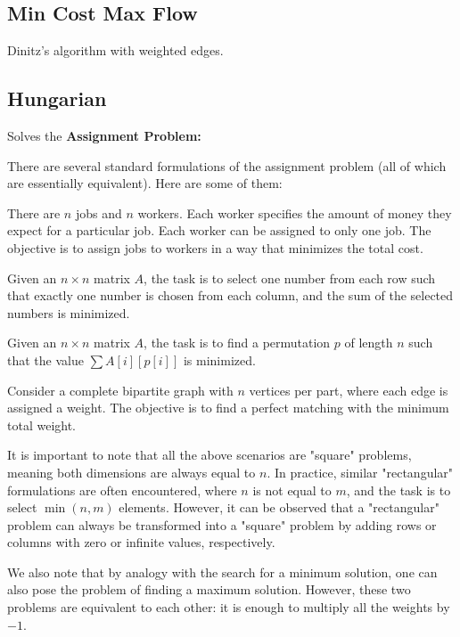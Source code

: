 	\subsection{Min Cost Max Flow}

		Dinitz's algorithm with weighted edges.


	\subsection{Hungarian}

		Solves the \textbf{Assignment Problem:}

		There are several standard formulations of the assignment problem (all of which are essentially equivalent). Here are some of them:

		There are $n$ jobs and $n$ workers. Each worker specifies the amount of money they expect for a particular job.
		Each worker can be assigned to only one job. The objective is to assign jobs to workers in a way that minimizes the total cost.

		Given an $n \times n$ matrix $A$, the task is to select one number from each row such that exactly 
		one number is chosen from each column, and the sum of the selected numbers is minimized.

		Given an $n \times n$ matrix $A$, the task is to find a permutation $p$ of length $n$ such that the value
		$\sum A[i]\left[p[i]\right]$ is minimized.

		Consider a complete bipartite graph with $n$ vertices per part, where each edge is assigned a weight.
		The objective is to find a perfect matching with the minimum total weight.

		It is important to note that all the above scenarios are "square" problems, meaning both dimensions are always equal to
		$n$. In practice, similar "rectangular" formulations are often encountered, where $n$ is not equal to 
		$m$, and the task is to select $\min(n,m)$ elements. However, it can be observed that a "rectangular" 
		problem can always be transformed into a "square" problem by adding rows or columns with zero or infinite values, respectively.

		We also note that by analogy with the search for a minimum solution, one can also pose the problem of finding a maximum solution. 
		However, these two problems are equivalent to each other: it is enough to multiply all the weights by $-1$.


